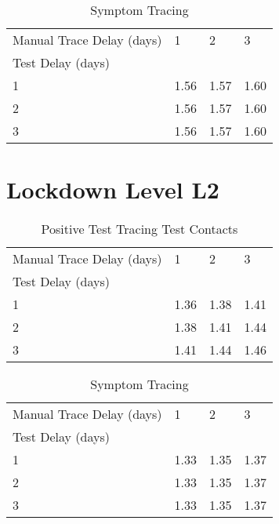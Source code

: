 \documentclass{article}
\begin{document}
    \begin{table}[H]
         \begin{tabular}{llll}
\toprule
Manual Trace Delay (days) &     1 &     2 &     3 \\
Test Delay (days) &       &       &       \\
\midrule
1                 &  1.56 &  1.57 &  1.60 \\
2                 &  1.56 &  1.57 &  1.60 \\
3                 &  1.56 &  1.57 &  1.60 \\
\bottomrule
\end{tabular}

        \caption{Symptom Tracing}
    \end{table}
    

\clearpage

\section{Lockdown Level L2}


    \begin{table}[H]
         \begin{tabular}{llll}
\toprule
Manual Trace Delay (days) &     1 &     2 &     3 \\
Test Delay (days) &       &       &       \\
\midrule
1                 &  1.36 &  1.38 &  1.41 \\
2                 &  1.38 &  1.41 &  1.44 \\
3                 &  1.41 &  1.44 &  1.46 \\
\bottomrule
\end{tabular}

        \caption{Positive Test Tracing Test Contacts}
    \end{table}
    


    \begin{table}[H]
         \begin{tabular}{llll}
\toprule
Manual Trace Delay (days) &     1 &     2 &     3 \\
Test Delay (days) &       &       &       \\
\midrule
1                 &  1.33 &  1.35 &  1.37 \\
2                 &  1.33 &  1.35 &  1.37 \\
3                 &  1.33 &  1.35 &  1.37 \\
\bottomrule
\end{tabular}

        \caption{Symptom Tracing}
    \end{table}
    
\end{document}
